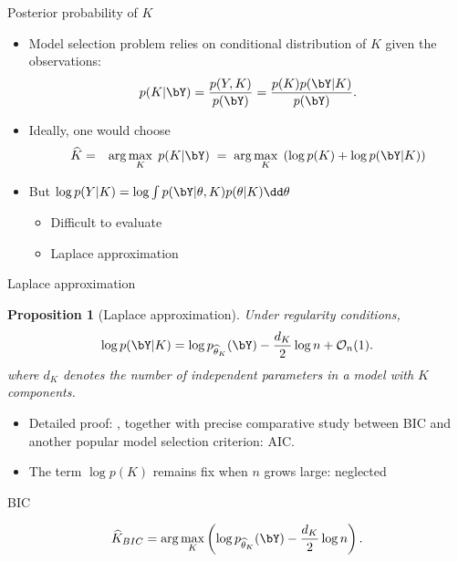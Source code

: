 \documentclass[compress,10pt]{beamer}
\newtheorem{proposition}{Proposition}
\begin{document}
\begin{frame}{Posterior probability of $K$}

\begin{itemize}
 \item Model selection problem relies on conditional distribution of $K$ given the observations:
$$
p(K|\bY) = \frac{p(Y, K)}{p(\bY)} = \frac{p(K) p(\bY|K)}{p(\bY)}.
$$
\item 
Ideally, one would choose
\begin{eqnarray*}
\widehat{K} & = & \arg\max_K \; p(K|\bY) \; = \; \arg\max_K \; \left(\log p(K) + \log p(\bY| K)\right) \\
\end{eqnarray*}
\item But 
$ \log p(Y| K) = \log \int p(\bY|\theta , K) p(\theta|K) \dd \theta$

\begin{itemize}
\item Difficult to evaluate 
\item Laplace approximation 
\end{itemize}
\end{itemize}
\end{frame}
\begin{frame}{Laplace approximation}

\begin{proposition}[Laplace approximation]
Under regularity conditions,
$$
\log p(\bY | K) = \log p_{\widehat{\theta}_K}(\bY) - \frac{d_K}2 \log n + \mathcal{O}_n(1).
$$
where $d_K$ denotes the number of independent parameters in a model with $K$ components.
\end{proposition}

\begin{itemize}
 \item Detailed proof:  \cite{Lebarbier04}, together with precise comparative study between BIC and another popular model selection criterion: AIC.
 \item The term $\log p(K)$ remains fix when $n$ grows large: neglected
\end{itemize}

\end{frame}


\begin{frame}{BIC}

\begin{definition}
 $$
  \widehat{K}_{BIC} = \arg\max_K \left(\log p_{\widehat{\theta}_K}(\bY) - \frac{d_K}2 \log n\right).
  $$ 
\end{definition}

\end{frame}
\end{document}
